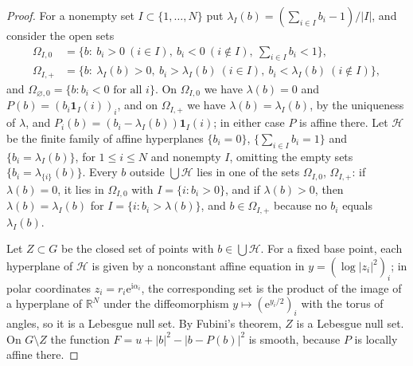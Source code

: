\begin{proof}
For a nonempty set $I\subset\{1,\ldots,N\}$ put $\lambda_I(b)=(\sum_{i\in I}b_i-1)/|I|$, and consider the open sets
\[
 \begin{aligned}
 \Omega_{I,0}&=\{b:\ b_i>0\ (i\in I),\ b_i<0\ (i\notin I),\ \textstyle\sum_{i\in I}b_i<1\},\\
 \Omega_{I,+}&=\{b:\ \lambda_I(b)>0,\ b_i>\lambda_I(b)\ (i\in I),\ b_i<\lambda_I(b)\ (i\notin I)\},
 \end{aligned}
\]
and $\Omega_{\varnothing,0}=\{b:b_i<0\text{ for all }i\}$. On $\Omega_{I,0}$ we have $\lambda(b)=0$ and $P(b)=(b_i\mathbf1_I(i))_i$, and on $\Omega_{I,+}$ we have $\lambda(b)=\lambda_I(b)$, by the uniqueness of $\lambda$, and $P_i(b)=(b_i-\lambda_I(b))\mathbf1_I(i)$; in either case $P$ is affine there. Let $\mathcal H$ be the finite family of affine hyperplanes $\{b_i=0\}$, $\{\sum_{i\in I}b_i=1\}$ and $\{b_i=\lambda_I(b)\}$, for $1\leq i\leq N$ and nonempty $I$, omitting the empty sets $\{b_i=\lambda_{\{i\}}(b)\}$. Every $b$ outside $\bigcup\mathcal H$ lies in one of the sets $\Omega_{I,0}$, $\Omega_{I,+}$: if $\lambda(b)=0$, it lies in $\Omega_{I,0}$ with $I=\{i:b_i>0\}$, and if $\lambda(b)>0$, then $\lambda(b)=\lambda_I(b)$ for $I=\{i:b_i>\lambda(b)\}$, and $b\in\Omega_{I,+}$ because no $b_i$ equals $\lambda_I(b)$.

Let $Z\subset G$ be the closed set of points with $b\in\bigcup\mathcal H$. For a fixed base point, each hyperplane of $\mathcal H$ is given by a nonconstant affine equation in $y=(\log|z_i|^2)_i$; in polar coordinates $z_i=r_i\mathrm e^{\mathrm i\alpha_i}$, the corresponding set is the product of the image of a hyperplane of $\mathbb R^N$ under the diffeomorphism $y\mapsto(\mathrm e^{y_i/2})_i$ with the torus of angles, so it is a Lebesgue null set. By Fubini's theorem, $Z$ is a Lebesgue null set. On $G\setminus Z$ the function $F=u+|b|^2-|b-P(b)|^2$ is smooth, because $P$ is locally affine there.


\end{proof}
